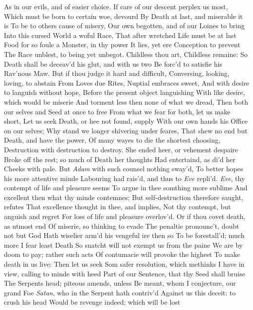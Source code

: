 \documentclass[11pt]{book}
\newcounter {last}
\begin{document}
As in our evils, and of easier choice. 
If care of our descent perplex us most, 
Which must be born to certain woe, devourd 
By Death at last, and miserable it is 
To be to others cause of misery, 
Our own begotten, and of our Loines to bring 
Into this cursed World a woful Race, 
That after wretched Life must be at last 
Food for so foule a Monster, in thy power 
It lies, yet ere Conception to prevent 
The Race unblest, to being yet unbegot. 
Childless thou art, Childless remaine: 
So Death shall be deceav'd his glut, and with us two 
Be forc'd to satisfie his Rav'nous Maw. 
But if thou judge it hard and difficult, 
Conversing, looking, loving, to abstain 
From Loves due Rites, Nuptial embraces sweet, 
And with desire to languish without hope, 
Before the present object languishing 
With like desire, which would be miserie 
And torment less then none of what we dread, 
Then both our selves and Seed at once to free 
From what we fear for both, let us make short, 
Let us seek Death, or hee not found, supply 
With our own hands his Office on our selves; 
Why stand we longer shivering under feares, 
That shew no end but Death, and have the power, 
Of many wayes to die the shortest choosing, 
Destruction with destruction to destroy. 
\quad She ended heer, or vehement despaire 
Broke off the rest; so much of Death her thoughts 
Had entertaind, as di'd her Cheeks with pale. 
But \textit{Adam} with such counsel nothing sway'd, 
To better hopes his more attentive minde 
Labouring had rais'd, and thus to \textit{Eve} repli'd. 
\quad \textit{Eve}, thy contempt of life and pleasure seems 
To argue in thee somthing more sublime 
And excellent then what thy minde contemnes; 
But self-destruction therefore saught, refutes 
That excellence thought in thee, and implies, 
Not thy contempt, but anguish and regret 
For loss of life and pleasure overlov'd. 
Or if thou covet death, as utmost end 
Of miserie, so thinking to evade 
The penaltie pronounc't, doubt not but God 
Hath wiselier arm'd his vengeful ire then so 
To be forestall'd; much more I fear least Death 
So snatcht will not exempt us from the paine 
We are by doom to pay; rather such acts 
Of contumacie will provoke the highest 
To make death in us live: Then let us seek 
Som safer resolution, which methinks 
I have in view, calling to minde with heed 
Part of our Sentence, that thy Seed shall bruise 
The Serpents head; piteous amends, unless 
Be meant, whom I conjecture, our grand Foe 
\textit{Satan}, who in the Serpent hath contriv'd 
Against us this deceit: to crush his head 
Would be revenge indeed; which will be lost 
\end{document}
